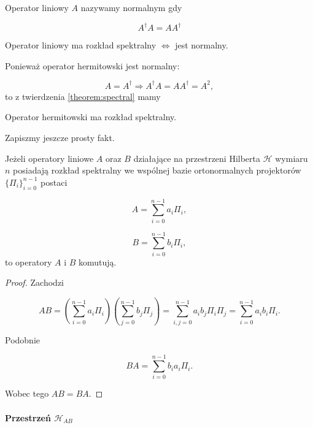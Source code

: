 \begin{definition}
    Operator liniowy $A$ nazywamy normalnym gdy

    $$
        A ^ {\dag} A = A A ^ {\dag}
    $$
\end{definition}

\begin{theorem}
    \label{theorem:spectral}
    Operator liniowy ma rozkład spektralny $\Leftrightarrow$ jest normalny.
\end{theorem}

Ponieważ operator hermitowski jest normalny:

$$
    A = A ^ {\dag} \Longrightarrow A ^ {\dag} A = A A ^ {\dag} = A ^ 2,
$$
to z twierdzenia \ref{theorem:spectral} mamy

\begin{corollary}
    \label{corollary:hermitian}
    Operator hermitowski ma rozkład spektralny.
\end{corollary}

Zapiszmy jeszcze prosty fakt.

\begin{fact}
    Jeżeli operatory liniowe $A$ oraz $B$ działające na przestrzeni Hilberta $\mathcal{H}$ wymiaru $n$ posiadają rozkład spektralny we wspólnej bazie ortonormalnych projektorów $\{\Pi_{i}\}_{i = 0} ^ {n - 1}$ postaci

    $$
        A = \sum\limits_{i = 0} ^ {n - 1} a_{i} \Pi_{i},
    $$

    $$
        B = \sum\limits_{i = 0} ^ {n - 1} b_{i} \Pi_{i},
    $$
    to operatory $A$ i $B$ komutują.
\end{fact}

\begin{proof}
    Zachodzi

    $$
        A B = \left(\sum\limits_{i = 0} ^ {n - 1} a_{i} \Pi_{i}\right) \left(\sum\limits_{j = 0} ^ {n - 1} b_{j} \Pi_{j}\right) = \sum\limits_{i, j = 0} ^ {n - 1} a_{i} b_{j} \Pi_{i} \Pi_{j} = \sum\limits_{i = 0} ^ {n - 1} a_{i} b_{i} \Pi_{i}.
    $$

    Podobnie

    $$
        B A = \sum\limits_{i = 0} ^ {n - 1} b_{i} a_{i} \Pi_{i}.
    $$

    Wobec tego $A B = B A$.
\end{proof}

\paragraph{Przestrzeń $\mathcal{H}_{AB}$}

